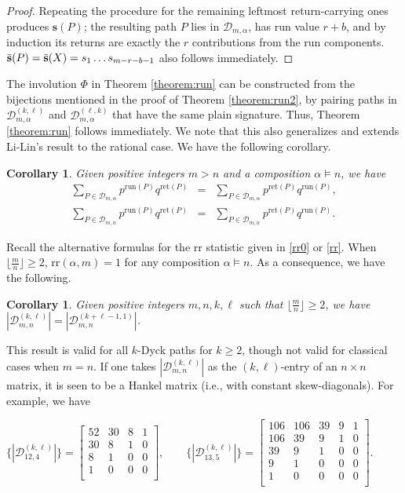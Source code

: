 \documentclass[11pt,a4paper,reqno]{article}
\newtheorem{cor}[thm]{Corollary}
\newcommand{\tref}[1]{Theorem \ref{theorem:#1}}
\newcommand{\DD}{\mathcal{D}}
\newcommand{\run}{\mathrm{run}}
\newcommand{\rr}{\mathrm{rr}}
\newcommand{\ret}{\mathrm{ret}}
\newcommand{\al}{\alpha}
\newcommand{\psig}{\Bar{\mathbf{s}}}
\newcommand{\sig}{\mathbf{s}}
\newcommand{\LiLan}{}
\begin{document}
{\begin{proof}
{Repeating the procedure for the remaining leftmost return-carrying ones produces $\sig(P)$; the resulting path $P$ lies in $\DD_{m,\alpha}$, has run value $r+b$, and by induction its returns are exactly the $r$ contributions from the run components. $\psig(P)=\psig(X)=s_1\dots s_{m-r-b-1}$ also follows immediately.}\end{proof}  

         
	
	The involution $\Phi$ in \tref{run} can be constructed from
	the bijections mentioned in the proof of \tref{run2},
	by pairing paths in $\DD_{m,\al}^{(k,\ell)}$ and $\DD_{m,\al}^{(\ell,k)}$ that have the same {\LiLan plain} signature. Thus, \tref{run} follows immediately. We note that this also generalizes and extends Li-Lin's result \cite[Theorem 2.3]{Li} to the rational case.
	We have the following corollary.
	\begin{cor}\label{symm:equ1}
		Given positive integers $m>n$ and a composition $\al\vDash n$, we have
		\begin{eqnarray*}
			\sum_{P\in \DD_{m,\al}}p^{\run(P)}q^{\ret(P)}&=&\sum_{P\in \DD_{m,\al}}p^{\ret(P)}q^{\run(P)},\\
			\sum_{P\in \DD_{m,n}}p^{\run(P)}q^{\ret(P)}&=&\sum_{P\in \DD_{m,n}}p^{\ret(P)}q^{\run(P)}.
		\end{eqnarray*}
	\end{cor}
	
	Recall the alternative formulas for the rr statistic given in \eqref{rr0} or \eqref{rr}. When $\lfloor \frac{m}{n} \rfloor\geq2$, $\rr(\al,m)=1$ for any composition $\al\vDash n$. As a consequence, we have the following.
	\begin{cor}\label{corodet}
		Given positive integers $m,n,k,\ell$ such that $\lfloor \frac{m}{n} \rfloor\geq2$, we have $|\DD_{m, n}^{(k,\ell)}|=|\DD_{m, n}^{(k+\ell-1,1)}|$.
	\end{cor}
	This result is valid for all $k$-Dyck paths for $k\geq 2$, though not valid for classical cases when $m=n$. {If one takes $|\DD_{m, n}^{(k,\ell)}|$ as the $(k,\ell)$-entry of an $n\times n$ matrix, it is seen to be a Hankel matrix (i.e., with constant skew-diagonals).} For example, we have
	\begin{center}
		$\{|\DD_{12, 4}^{(k,\ell)}|\}=\left[
		\begin{matrix}
			52&30&8&1\\
			30&8&1&0\\
			8&1&0&0\\
			1&0&0&0\\
		\end{matrix}\right],\qquad \{|\DD_{13, 5}^{(k,\ell)}|\}=\left[
		\begin{matrix}
			106&106&39&9&1\\
			106&39&9&1&0\\
			39&9&1&0&0\\
			9&1&0&0&0\\
			1&0&0&0&0\\
		\end{matrix}\right].$
	\end{center}
	
}
\end{document}
